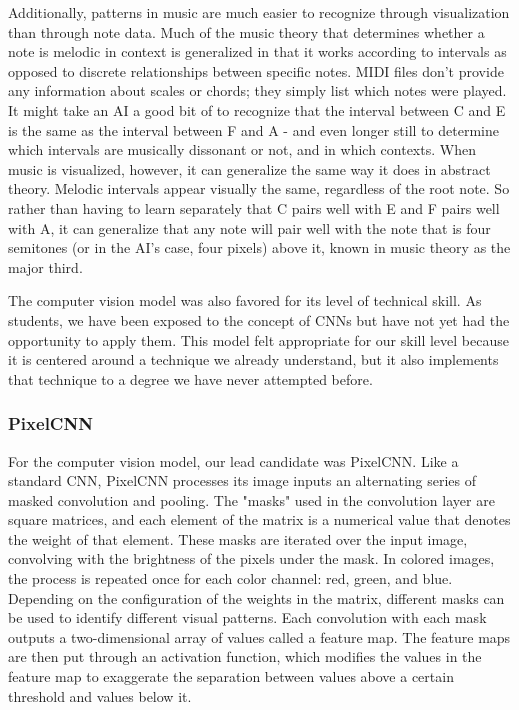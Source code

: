 Additionally, patterns in music are much easier to recognize through visualization than
through note data. Much of the music theory that determines whether a note is melodic in
context is generalized in that it works according to intervals as opposed to discrete
relationships between specific notes. MIDI files don't provide any information about scales
or chords; they simply list which notes were played. It might take an AI a good bit of
to recognize that the interval between C and E is the same as the interval between F and A -
and even longer still to determine which intervals are musically dissonant or not, and in
which contexts. When music is visualized, however, it can generalize the same way it does in
abstract theory. Melodic intervals appear visually the same, regardless of the root note. So
rather than having to learn separately that C pairs well with E and F pairs well with A, it
can generalize that any note will pair well with the note that is four semitones (or in the
AI's case, four pixels) above it, known in music theory as the major third.

The computer vision model was also favored for its level of technical skill. As students, we
have been exposed to the concept of CNNs but have not yet had the opportunity to apply
them. This model felt appropriate for our skill level because it is centered around a
technique we already understand, but it also implements that technique to a degree we have
never attempted before.

\subsubsection{PixelCNN}

For the computer vision model, our lead candidate was PixelCNN. Like a standard CNN,
PixelCNN processes its image inputs an alternating series of masked convolution and pooling.
The "masks" used in the convolution layer are square matrices, and each element of the matrix
is a numerical value that denotes the weight of that element. These masks are iterated over the
input image, convolving with the brightness of the pixels under the mask. In colored images,
the process is repeated once for each color channel: red, green, and blue. Depending on the
configuration of the weights in the matrix, different masks can be used to identify different
visual patterns. Each convolution with each mask outputs a two-dimensional array of values
called a feature map. The feature maps are then put through an activation function, which
modifies the values in the feature map to exaggerate the separation between values above a
certain threshold and  values below it.

